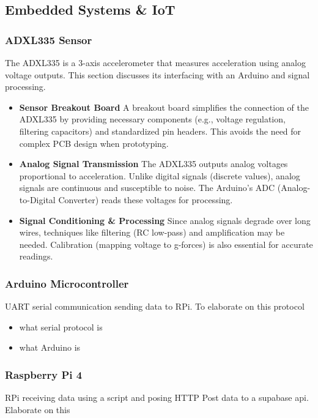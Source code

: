 \subsection{Embedded Systems \& IoT}  
\subsubsection{ADXL335 Sensor}  
The ADXL335 is a 3-axis accelerometer that measures acceleration using analog voltage outputs. This section discusses its interfacing with an Arduino and signal processing.  

\begin{itemize}  
	\item \textbf{Sensor Breakout Board}  
	A breakout board simplifies the connection of the ADXL335 by providing necessary components (e.g., voltage regulation, filtering capacitors) and standardized pin headers. This avoids the need for complex PCB design when prototyping.  
	
	\item \textbf{Analog Signal Transmission}  
	The ADXL335 outputs analog voltages proportional to acceleration. Unlike digital signals (discrete values), analog signals are continuous and susceptible to noise. The Arduino's ADC (Analog-to-Digital Converter) reads these voltages for processing.  
	
	\item \textbf{Signal Conditioning \& Processing}  
	Since analog signals degrade over long wires, techniques like filtering (RC low-pass) and amplification may be needed. Calibration (mapping voltage to g-forces) is also essential for accurate readings.  
\end{itemize}




\subsubsection{Arduino Microcontroller}
UART serial communication sending data to RPi. To elaborate on this protocol
\begin{itemize}
\item what serial protocol is
\item what Arduino is
\end{itemize}

\subsubsection{Raspberry Pi 4}
RPi receiving data using a script and posing HTTP Post data to a supabase api. Elaborate on this

